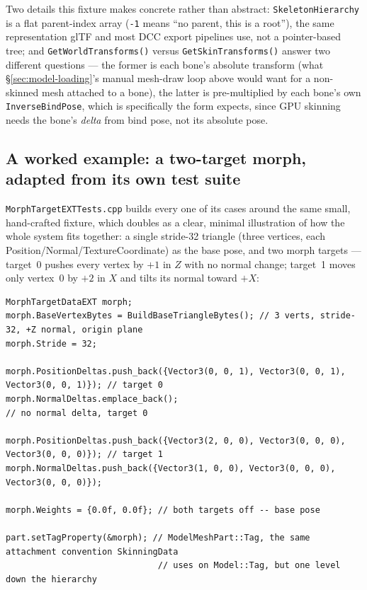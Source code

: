 Two details this fixture makes concrete rather than abstract: \texttt{SkeletonHierarchy} is a
flat parent-index array (\texttt{-1} means ``no parent, this is a root''), the same
representation glTF and most DCC export pipelines use, not a pointer-based tree; and
\texttt{GetWorldTransforms()} versus \texttt{GetSkinTransforms()} answer two different
questions --- the former is each bone's absolute transform (what \S\ref{sec:model-loading}'s
manual mesh-draw loop above would want for a non-skinned mesh attached to a bone), the latter
is pre-multiplied by each bone's own \texttt{InverseBindPose}, which is specifically the form
 expects, since GPU skinning needs the bone's
\emph{delta} from bind pose, not its absolute pose.

\subsection{A worked example: a two-target morph, adapted from its own test suite}

\texttt{MorphTargetEXTTests.cpp} builds every one of its cases around the same small,
hand-crafted fixture, which doubles as a clear, minimal illustration of how the whole system
fits together: a single stride-32 triangle (three vertices, each Position/Normal/TextureCoordinate)
as the base pose, and two morph targets --- target~0 pushes every vertex by $+1$ in $Z$ with no
normal change; target~1 moves only vertex~0 by $+2$ in $X$ and tilts its normal toward $+X$:

\begin{lstlisting}
MorphTargetDataEXT morph;
morph.BaseVertexBytes = BuildBaseTriangleBytes(); // 3 verts, stride-32, +Z normal, origin plane
morph.Stride = 32;

morph.PositionDeltas.push_back({Vector3(0, 0, 1), Vector3(0, 0, 1), Vector3(0, 0, 1)}); // target 0
morph.NormalDeltas.emplace_back();                                    // no normal delta, target 0

morph.PositionDeltas.push_back({Vector3(2, 0, 0), Vector3(0, 0, 0), Vector3(0, 0, 0)}); // target 1
morph.NormalDeltas.push_back({Vector3(1, 0, 0), Vector3(0, 0, 0), Vector3(0, 0, 0)});

morph.Weights = {0.0f, 0.0f}; // both targets off -- base pose

part.setTagProperty(&morph); // ModelMeshPart::Tag, the same attachment convention SkinningData
                              // uses on Model::Tag, but one level down the hierarchy
\end{lstlisting}

